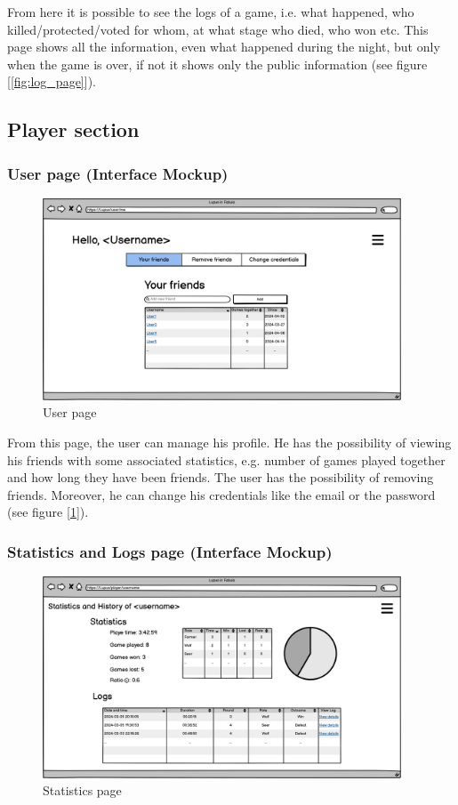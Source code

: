 From here it is possible to see the logs of a game, i.e. what happened, who killed/protected/voted for whom, at what stage who died, who won etc.
This page shows all the information, even what happened during the night, but only when the game is over, if not it shows only the public information (see figure [\ref{fig:log_page}]).

\subsection{Player section}

\subsubsection{User page (Interface Mockup)}
\begin{figure}[htb] 
    \centering
    \includegraphics[height=6cm]{images/Page/User.png}
    \caption{User page}
    \label{fig:user_page}
\end{figure}

From this page, the user can manage his profile. He has the possibility of viewing his friends with some associated statistics, e.g. number of games played together and how long they have been friends. 
The user has the possibility of removing friends. Moreover, he can change his credentials like the email or the password (see figure [\ref{fig:user_page}]).

\subsubsection{Statistics and Logs page (Interface Mockup)}
\begin{figure}[htb] 
    \centering
    \includegraphics[height=6cm]{images/Page/Statistics.png}
    \caption{Statistics page}
    \label{fig:statistics_page}
\end{figure}

